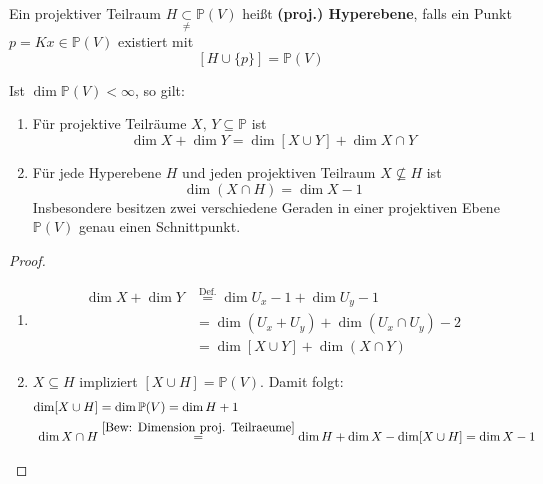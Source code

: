 \documentclass[parskip,a4paper,twoside,DIV15,BCOR12mm]{scrbook}
\begin{document}
\begin{definition}
Ein projektiver Teilraum \(H\underset{\neq}{\subset}\mathbb{P}(V)\) heißt
\textbf{(proj.) Hyperebene}, falls ein Punkt \(p=Kx\in\mathbb{P}(V)\) existiert
mit
\[
[H\cup\{p\}]=\mathbb{P}(V)
\]
\end{definition}
\begin{comment}
Falls \(n=\dim\mathbb{P}(V)<\infty\) ist, so gilt für projektive Teilräume
\(H\subseteq\mathbb{P}(V)\):
\[
H\text{ Hyperebene}\Longleftrightarrow\dim H=n-1
\]
\end{comment}
\begin{theo}
\label{Satz 24.1}
Ist \(\dim\mathbb{P}(V)<\infty\), so gilt:
\begin{enumerate}
\item Für projektive Teilräume \(X,\,Y\subseteq\mathbb{P}\) ist
\[
\dim X+\dim Y=\dim[X\cup Y]+\dim{X\cap Y}
\]
\item Für jede Hyperebene \(H\) und jeden projektiven Teilraum 
\(X\not\subseteq H\) ist
\[
\dim(X\cap H)=\dim X-1
\]
Insbesondere besitzen zwei verschiedene Geraden in einer projektiven Ebene
\(\mathbb{P}(V)\) genau einen Schnittpunkt.
\end{enumerate}
\end{theo}
\begin{proof}
\begin{enumerate}
\item
\label{Bew: Dimension proj. Teilraeume}
    \begin{align*}
	\dim X+\dim Y&\overset{\text{Def.}}{=}\dim U_{x}-1+\dim U_{y}-1\\
	&=\dim(U_{x}+U_{y})+\dim(U_{x}\cap U_{y})-2\\
	&=\dim[X\cup Y]+\dim(X\cap Y)
    \end{align*}
\item \(X\subseteq H\) impliziert \([X\cup H]=\mathbb{P}(V)\). Damit folgt:
    \begin{align*}
	\dim[X\cup H]&=\dim\mathbb{P}(V)=\dim H+1\\
	\dim X\cap H&\overset{\eqref{Bew: Dimension proj. Teilraeume}}{=}
	    \dim H+\dim X-\dim[X\cup H]=\dim X-1
    \end{align*}
\end{enumerate}
\end{proof}
\end{document}
